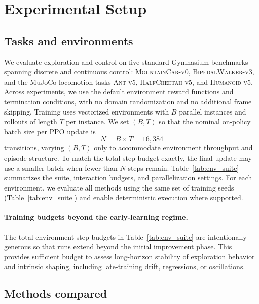 \section{Experimental Setup}
\label{sec:experimental_setup}

\subsection{Tasks and environments}

We evaluate exploration and control on five standard Gymnasium benchmarks spanning discrete and continuous control: \textsc{MountainCar-v0}, \textsc{BipedalWalker-v3}, and the MuJoCo locomotion tasks \textsc{Ant-v5}, \textsc{HalfCheetah-v5}, and \textsc{Humanoid-v5}.
Across experiments, we use the default environment reward functions and termination conditions, with no domain randomization and no additional frame skipping.
Training uses vectorized environments with $B$ parallel instances and rollouts of length $T$ per instance.
We set $(B,T)$ so that the nominal on-policy batch size per PPO update is
\begin{equation}
    N = B \times T = 16{,}384
\end{equation}
transitions, varying $(B,T)$ only to accommodate environment throughput and episode structure.
To match the total step budget exactly, the final update may use a smaller batch when fewer than $N$ steps remain.
Table~\ref{tab:env_suite} summarizes the suite, interaction budgets, and parallelization settings.
For each environment, we evaluate all methods using the same set of training seeds (Table~\ref{tab:env_suite}) and enable deterministic execution where supported.



\paragraph{Training budgets beyond the early-learning regime.}
The total environment-step budgets in Table~\ref{tab:env_suite} are intentionally generous so that runs extend beyond the initial improvement phase.
This provides sufficient budget to assess long-horizon stability of exploration behavior and intrinsic shaping, including late-training drift, regressions, or oscillations.

\subsection{Methods compared}
\label{sec:experimental_setup:methods}

